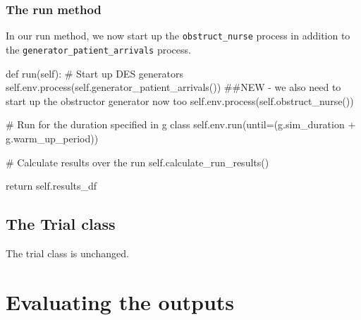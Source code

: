 \documentclass[
  letterpaper,
  DIV=11,
  numbers=noendperiod]{scrreprt}
\newenvironment{Shaded}{\begin{snugshade}}{\end{snugshade}}
\newcommand{\CommentTok}[1]{\textcolor[rgb]{0.37,0.37,0.37}{#1}}
\newcommand{\ControlFlowTok}[1]{\textcolor[rgb]{0.00,0.23,0.31}{#1}}
\newcommand{\KeywordTok}[1]{\textcolor[rgb]{0.00,0.23,0.31}{#1}}
\newcommand{\NormalTok}[1]{\textcolor[rgb]{0.00,0.23,0.31}{#1}}
\newcommand{\OperatorTok}[1]{\textcolor[rgb]{0.37,0.37,0.37}{#1}}
\newcommand{\VariableTok}[1]{\textcolor[rgb]{0.07,0.07,0.07}{#1}}
\begin{document}
\subsubsection{The run method}\label{the-run-method-2}

In our run method, we now start up the \texttt{obstruct\_nurse} process
in addition to the \texttt{generator\_patient\_arrivals} process.

\begin{Shaded}
\begin{Highlighting}[]
\KeywordTok{def}\NormalTok{ run(}\VariableTok{self}\NormalTok{):}
    \CommentTok{\# Start up DES generators}
    \VariableTok{self}\NormalTok{.env.process(}\VariableTok{self}\NormalTok{.generator\_patient\_arrivals())}
    \CommentTok{\#\#NEW {-} we also need to start up the obstructor generator now too}
    \VariableTok{self}\NormalTok{.env.process(}\VariableTok{self}\NormalTok{.obstruct\_nurse())}

    \CommentTok{\# Run for the duration specified in g class}
    \VariableTok{self}\NormalTok{.env.run(until}\OperatorTok{=}\NormalTok{(g.sim\_duration }\OperatorTok{+}\NormalTok{ g.warm\_up\_period))}

    \CommentTok{\# Calculate results over the run}
    \VariableTok{self}\NormalTok{.calculate\_run\_results()}

    \ControlFlowTok{return} \VariableTok{self}\NormalTok{.results\_df}
\end{Highlighting}
\end{Shaded}

\subsection{The Trial class}\label{the-trial-class-3}

The trial class is unchanged.

\section{Evaluating the outputs}\label{evaluating-the-outputs-3}
\end{document}
